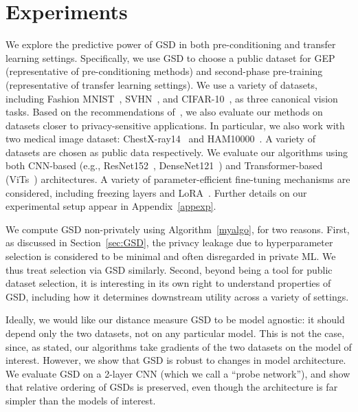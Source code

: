 \documentclass[11pt]{article}
\begin{document}
\section{Experiments}
We explore the predictive power of GSD in both pre-conditioning and transfer learning settings.
Specifically, we use GSD to choose a public dataset for GEP~\cite{donot} (representative of pre-conditioning methods) and second-phase pre-training (representative of transfer learning settings).
We use a variety of datasets, including Fashion MNIST~\cite{fmnist}, SVHN~\cite{svhn}, and CIFAR-10~\cite{cifar10}, as three canonical vision tasks. 
Based on the recommendations of~\cite{TramerKC22}, we also evaluate our methods on datasets closer to privacy-sensitive applications.
In particular, we also work with two medical image dataset: ChestX-ray14~\cite{chestxray} and HAM10000~\cite{ham}. A variety of datasets are chosen as public data respectively. 
We evaluate our algorithms using both CNN-based (e.g., ResNet152~\cite{resnet}, DenseNet121~\cite{densenet}) and Transformer-based (ViTs~\cite{vit}) architectures. 
A variety of parameter-efficient fine-tuning mechanisms are considered, including freezing layers and LoRA~\cite{lora}. Further details on our experimental setup appear in Appendix~\ref{appexp}.

We compute GSD non-privately using Algorithm~\ref{myalgo}, for two reasons. First, as discussed in Section~\ref{sec:GSD}, the privacy leakage due to hyperparameter selection is considered to be minimal and often disregarded in private ML.
We thus treat selection via GSD similarly.
Second, beyond being a tool for public dataset selection, it is interesting in its own right to understand properties of GSD, including how it determines downstream utility across a variety of settings.


Ideally, we would like our distance measure GSD to be model agnostic: it should depend only the two datasets, not on any particular model. 
This is not the case, since, as stated, our algorithms take gradients of the two datasets on the model of interest. 
However, we show that GSD is robust to changes in model architecture.
We evaluate GSD on a 2-layer CNN (which we call a ``probe network''), and show that relative ordering of GSDs is preserved, even though the architecture is far simpler than the models of interest. 
\end{document}

